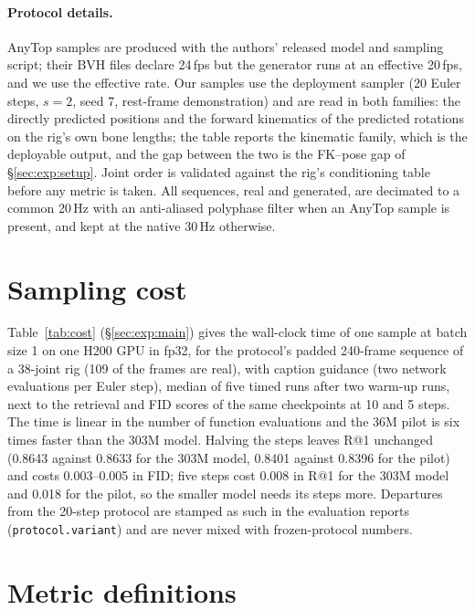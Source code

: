 \paragraph{Protocol details.} AnyTop samples are produced with the authors' released model and
sampling script; their BVH files declare 24\,fps but the generator runs at an effective 20\,fps, and
we use the effective rate. Our samples use the deployment sampler (20 Euler steps, $s{=}2$, seed 7,
rest-frame demonstration) and are read in both families: the directly predicted positions and the
forward kinematics of the predicted rotations on the rig's own bone lengths; the table reports the
kinematic family, which is the deployable output, and the gap between the two is the FK--pose gap of
\S\ref{sec:exp:setup}. Joint order is validated against the rig's conditioning table before any
metric is taken. All sequences, real and generated, are decimated to a common 20\,Hz with an
anti-aliased polyphase filter when an AnyTop sample is present, and kept at the native 30\,Hz
otherwise.

\section{Sampling cost}\label{app:cost}

Table~\ref{tab:cost} (\S\ref{sec:exp:main}) gives the wall-clock time of one sample at batch size 1 on one H200 GPU in fp32, for the
protocol's padded 240-frame sequence of a 38-joint rig (\num{109} of the frames are real), with caption
guidance (two network evaluations per Euler step), median of five timed runs after two warm-up runs, next to the
retrieval and FID scores of the same checkpoints at 10 and 5 steps. The time is linear in the number of function
evaluations and the \num{36}M pilot is six times faster than the \num{303}M model. Halving the steps leaves R@1
unchanged (\num{0.8643} against \num{0.8633} for the \num{303}M model, \num{0.8401} against \num{0.8396} for the
pilot) and costs \num{0.003}--\num{0.005} in FID; five steps cost \num{0.008} in R@1 for the \num{303}M model and
\num{0.018} for the pilot, so the smaller model needs its steps more.
Departures from the 20-step protocol are stamped as such in the evaluation reports (\texttt{protocol.variant}) and
are never mixed with frozen-protocol numbers.


\section{Metric definitions}\label{app:metrics}

